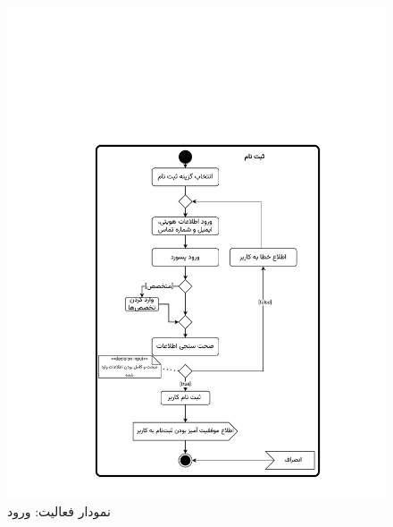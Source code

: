 \begin{figure}
	\centering
	\includegraphics[scale=0.8, page=2]{figs/OOD-activity1-10.pdf}
	\caption{نمودار فعالیت: ورود}
\end{figure}
\FloatBarrier
\newpage

